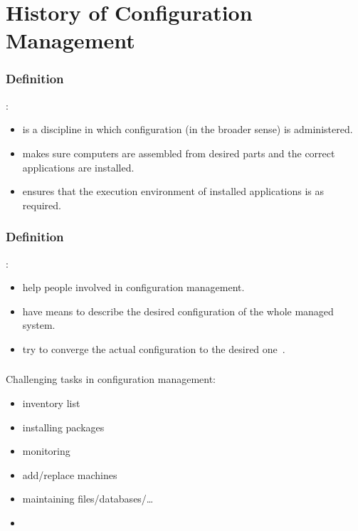 \section{History of Configuration Management}

\begin{frame}
	\frametitle{Definition}

	:

	\begin{itemize}
	\item is a discipline in which configuration (in the broader sense) is administered.
	\item makes sure computers are assembled from desired parts and the correct applications are installed.
	\item ensures that the execution environment of installed applications is as required.%
	\end{itemize}
\end{frame}


\begin{frame}
	\frametitle{Definition}

	:

	\pause

	\begin{itemize}
	\item help people involved in configuration management.
	\item have means to describe the desired configuration of the whole managed system.
	\item try to converge the actual configuration to the desired one~\cite{burgess1995cfengine}.
	\end{itemize}
\end{frame}


\begin{frame}
	\frametitle{}

	Challenging tasks in configuration management:

	\pause

	\begin{itemize}
	\item inventory list
	\item installing packages
	\item monitoring
	\item add/replace machines
	\item maintaining files/databases/\dots
	\item {}
	\end{itemize}
\end{frame}

